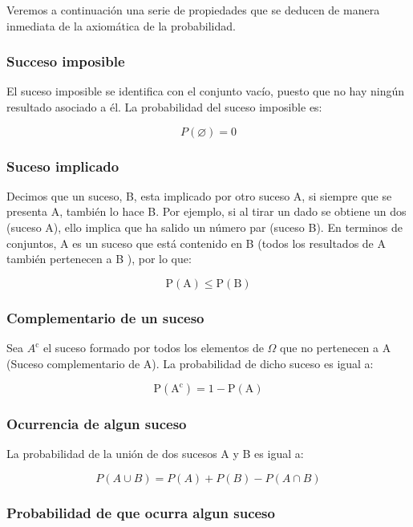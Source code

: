 \documentclass[
]{article}
\begin{document}
Veremos a continuación una serie de propiedades que se deducen de manera
inmediata de la axiomática de la probabilidad.

\subsubsection{Succeso imposible}\label{succeso-imposible}

El suceso imposible se identifica con el conjunto vacío, puesto que no hay ningún resultado asociado a él. La probabilidad del suceso imposible es:

\[
P(\varnothing)=0
\]

\subsubsection{Suceso implicado}\label{suceso-implicado}

Decimos que un suceso, B, esta implicado por otro suceso A, si siempre que se presenta A, también lo hace B. Por ejemplo, si al tirar un dado se obtiene un dos (suceso A), ello implica que ha salido un número par (suceso B). En terminos de conjuntos, A es un suceso que está contenido en B (todos los resultados de A
también pertenecen a B ), por lo que:

\[
\mathrm{P}(\mathrm{A}) \leq \mathrm{P}(\mathrm{B})
\]

\subsubsection{Complementario de un suceso}\label{complementario-de-un-suceso}

Sea \(A^{\mathrm{c}}\) el suceso formado por todos los elementos de
\(\Omega\) que no pertenecen a A (Suceso complementario de A). La
probabilidad de dicho suceso es igual a:

\[
\mathrm{P}\left(\mathrm{A}^{\mathrm{c}}\right)=1-\mathrm{P}(\mathrm{A})
\]

\subsubsection{Ocurrencia de algun suceso}\label{ocurrencia-de-algun-suceso}

La probabilidad de la unión de dos sucesos A y B es igual a:

\[
P(A \cup B)=P(A)+P(B)-P(A \cap B)
\]

\subsubsection{Probabilidad de que ocurra algun suceso}\label{probabilidad-de-que-ocurra-algun-suceso}
\end{document}

